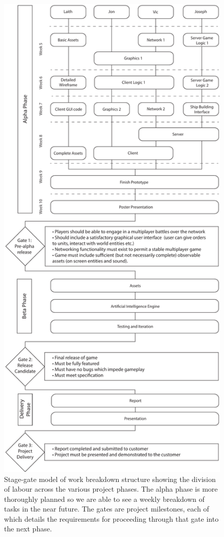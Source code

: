 \begin{figure}
	\includegraphics{res/stage_gate_diagram}
	\caption{Stage-gate model of work breakdown structure showing the division of labour across the various project phases. 
	The alpha phase is more thoroughly planned so we are able to see a weekly breakdown of tasks in the near future. The gates are project milestones, each of which details the requirements for proceeding through that gate into the next phase.}
\end{figure}
